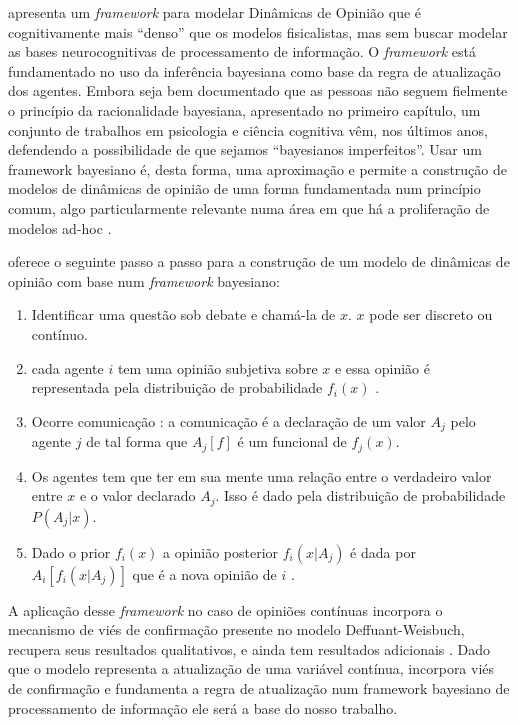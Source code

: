 apresenta um \textit{framework} para modelar
Dinâmicas de Opinião que é cognitivamente mais
``denso'' que os modelos fisicalistas, mas sem buscar modelar as bases
neurocognitivas de processamento de informação. O \textit{framework} está
fundamentado no uso da inferência bayesiana como base da regra de atualização
dos agentes. Embora seja bem documentado que as pessoas não seguem fielmente o
princípio da racionalidade bayesiana, apresentado no primeiro capítulo, um
conjunto de trabalhos em psicologia e ciência cognitiva vêm, nos últimos anos,
defendendo a possibilidade de que sejamos ``bayesianos
imperfeitos''\cite{griffiths2006optimal,fujikawa2007perfect,baker2017rational,
  gintis2016individuality}. Usar um framework bayesiano é, desta forma, uma
aproximação e permite a construção de modelos de dinâmicas de opinião de uma
forma fundamentada num princípio comum, algo particularmente relevante numa área
em que há a proliferação de modelos ad-hoc \cite{flache2017,jager2017}.

  oferece o seguinte passo a passo
para a construção de um modelo de dinâmicas de opinião com base num
\textit{framework} bayesiano:

\begin{enumerate}
\item Identificar uma questão sob debate e chamá-la de $x$. \(x\) pode ser
  discreto ou contínuo.
\item cada agente \(i\) tem uma opinião subjetiva sobre $x$ e essa opinião é
  representada pela distribuição de probabilidade $f_i(x)$ .
\item Ocorre comunicação : a comunicação é a declaração de um valor
  $ A_j$ pelo agente $j$ de tal forma que $A_j[f]$ é um funcional de
  $f_j(x)$.
\item Os agentes tem que ter em sua mente  uma relação entre o
  verdadeiro valor entre $x$ e o valor declarado $A_j$. Isso é dado
  pela distribuição de probabilidade $P(A_j|x)$.
\item Dado o prior $f_i(x)$ a opinião posterior $f_i(x|A_j)$ é dada
  por $A_i[f_i(x|A_j)]$ que é a nova opinião de $i$ .
\end{enumerate}





A aplicação desse \textit{framework} no caso de opiniões contínuas incorpora o
mecanismo de viés de confirmação presente no modelo  Deffuant-Weisbuch,
recupera seus resultados qualitativos, e ainda tem resultados adicionais
\cite{martins2009bayesian}. Dado que o modelo representa a atualização de uma
variável contínua, incorpora viés de confirmação e fundamenta a regra de
atualização num framework bayesiano de processamento de informação ele será a base
do nosso trabalho. 

